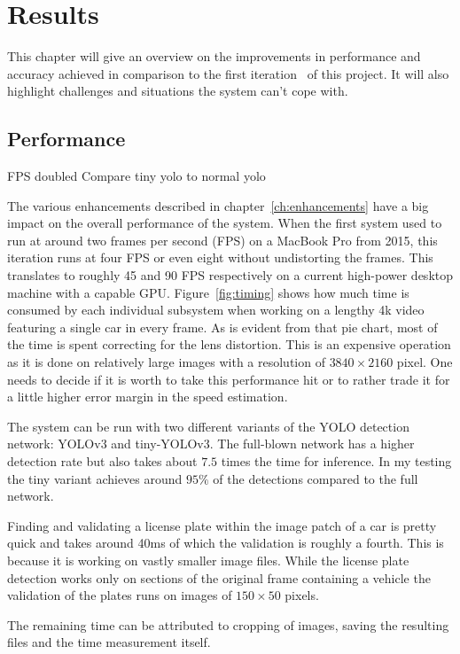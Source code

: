 \chapter{Results} \label{ch:results}

This chapter will give an overview on the improvements in performance and accuracy achieved in comparison to the first iteration~\cite{Berger2018} of this project.
It will also highlight challenges and situations the system can't cope with.

\section{Performance}
FPS doubled
Compare tiny yolo to normal yolo

The various enhancements described in chapter~\ref{ch:enhancements} have a big impact on the overall performance of the system.
When the first system used to run at around two frames per second (FPS) on a MacBook Pro from 2015, this iteration runs at four FPS or even eight without undistorting the frames.
This translates to roughly 45 and 90 FPS respectively on a current high-power desktop machine with a capable GPU\@.
Figure~\ref{fig:timing} shows how much time is consumed by each individual subsystem when working on a lengthy 4k video featuring a single car in every frame.
As is evident from that pie chart, most of the time is spent correcting for the lens distortion.
This is an expensive operation as it is done on relatively large images with a resolution of $3840 \times 2160$ pixel.
One needs to decide if it is worth to take this performance hit or to rather trade it for a little higher error margin in the speed estimation.

The system can be run with two different variants of the YOLO detection network: YOLOv3 and tiny-YOLOv3.
The full-blown network has a higher detection rate but also takes about $7.5$ times the time for inference.
In my testing the tiny variant achieves around $95\%$ of the detections compared to the full network.

Finding and validating a license plate within the image patch of a car is pretty quick and takes around 40ms of which the validation is roughly a fourth.
This is because it is working on vastly smaller image files.
While the license plate detection works only on sections of the original frame containing a vehicle the validation of the plates runs on images of $150 \times 50$ pixels.

The remaining time can be attributed to cropping of images, saving the resulting files and the time measurement itself.

